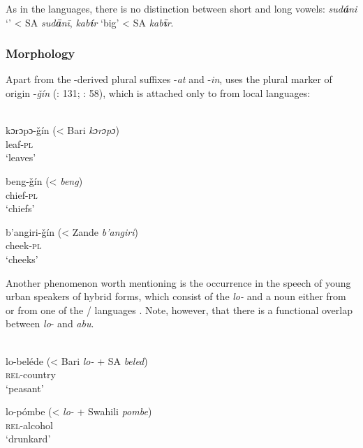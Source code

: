 \documentclass[output=paper]{langsci/langscibook}
\begin{document}
As in the  languages, there is no distinction between short and long vowels:   \textit{sud\textbf{á}ni} ‘’ < SA \textit{sud\textbf{ā}nī},  \textit{kab\textbf{í}r} ‘big’ < SA \textit{kab\textbf{ī}r}.


 \subsubsection{Morphology}

Apart from the -derived plural suffixes -\textit{at} and -\textit{in},   uses the plural marker of  origin -\textit{ǧín} (\citealt{Nakao2012}: 131; \citealt{Manfredi2014plural}: 58), which is attached only to  from local languages:


\ea
{  \citep[58]{Manfredi2014plural}}\\
\ea
\gll kɔrɔpɔ-ǧín (\textup{< Bari} \textit{kɔrɔpɔ})\\
    leaf-\textsc{pl}\\
\glt       `leaves' 

\ex
\gll beng-ǧín (<  \textit{beng}) \\
         chief-\textsc{pl}\\
\glt       `chiefs'


\ex
\gll  b'angiri-ǧín (< \textup{Zande} \textit{b'angiri}) \\
         cheek\textsc{-pl}\\
\glt       `cheeks' 
\z
\z

Another phenomenon worth mentioning is the occurrence in the speech of young urban speakers of hybrid forms, which consist of the   \textit{lo-} and a noun either from  or from one of the / languages \citep[131]{Nakao2012}. Note, however, that there is a functional overlap between  \textit{lo}- and   \textit{abu}.

\ea\label{lo}
{  \citep[46]{Manfredi2017}}\\
\ea\gll lo-beléde (\textup{< Bari} \textit{lo-} \textup{+ SA} \textit{beled})\\
\textsc{rel}-country\\
\glt       `peasant'

\ex
\gll lo-pómbe (<  \textit{lo-} + \textup{Swahili} \textit{pombe})\\
 \textsc{rel}-alcohol\\
\glt    `drunkard'
\z
\z
\end{document}

